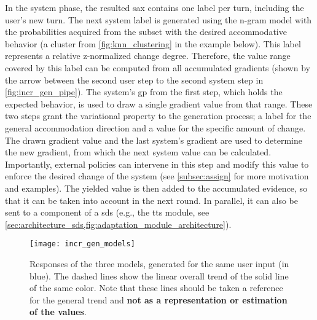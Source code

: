 In the system phase, the resulted \ac{sax} contains one label per turn, including the user's new turn.
The next system label is generated using the n-gram model with the probabilities acquired from the subset with the desired accommodative behavior (a cluster from \cref{fig:knn_clustering} in the example below).
This label represents a relative z-normalized change degree.
Therefore, the value range covered by this label can be computed from all accumulated gradients (shown by the arrow between the second user step to the second system step in \cref{fig:incr_gen_pipe}).
The system's \ac{gp} from the first step, which holds the expected behavior, is used to draw a single gradient value from that range.
These two steps grant the variational property to the generation process; a label for the general accommodation direction and a value for the specific amount of change.
The drawn gradient value and the last system's gradient are used to determine the new gradient, from which the next system value can be calculated.
Importantly, external policies can intervene in this step and modify this value to enforce the desired change of the system (see \cref{subsec:assign} for more motivation and examples).
The yielded value is then added to the accumulated evidence, so that it can be taken into account in the next round.
In parallel, it can also be sent to a component of a \ac{sds} (e.g., the \ac{tts} module, see \cref{sec:architecture_sds,fig:adaptation_module_architecture}).

\begin{figure}[t]
	\centering
	\texttt{[image: incr\_gen\_models]}
	\caption[]
		{Responses of the three models, generated for the same user input (in blue).
	 	 The dashed lines show the linear overall trend of the solid line of the same color.
	 	 Note that these lines should be taken a reference for the general trend and \textbf{not as a representation or estimation of the values}.}
	\label{fig:incr_gen_models}
\end{figure}

